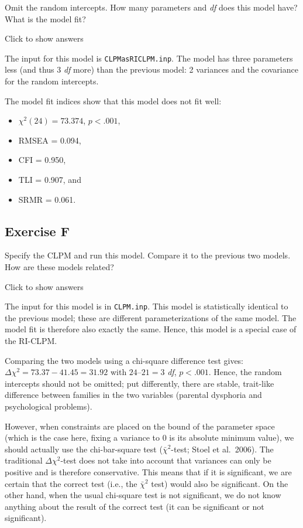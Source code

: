 \documentclass[
]{book}
\providecommand{\tightlist}{%
  \setlength{\itemsep}{0pt}\setlength{\parskip}{0pt}}
\begin{document}
Omit the random intercepts. How many parameters and \emph{df} does this model have? What is the model fit?

Click to show answers

The input for this model is \texttt{CLPMasRICLPM.inp}. The model has three parameters less (and thus 3 \emph{df} more) than the previous model: 2 variances and the covariance for the random intercepts.

The model fit indices show that this model does not fit well:

\begin{itemize}
\tightlist
\item
  \(\chi^{2} (24) = 73.374\), \(p < .001\),
\item
  RMSEA = 0.094,
\item
  CFI = 0.950,
\item
  TLI = 0.907, and
\item
  SRMR = 0.061.
\end{itemize}

\hypertarget{exercise-f-1}{%
\subsection{Exercise F}\label{exercise-f-1}}

Specify the CLPM and run this model. Compare it to the previous two models. How are these models related?

Click to show answers

The input for this model is in \texttt{CLPM.inp}. This model is statistically identical to the previous model; these are different parameterizations of the same model. The model fit is therefore also exactly the same. Hence, this model is a special case of the RI-CLPM.

Comparing the two models using a chi-square difference test gives: \(\Delta \chi^{2} = 73.37 - 41.45 = 31.92\) with \(24 – 21 = 3\) \emph{df}, \(p < .001\). Hence, the random intercepts should not be omitted; put differently, there are stable, trait-like difference between families in the two variables (parental dysphoria and psychological problems).

However, when constraints are placed on the bound of the parameter space (which is the case here, fixing a variance to 0 is its absolute minimum value), we should actually use the chi-bar-square test (\(\bar{\chi}^{2}\)-test; Stoel et al.~2006). The traditional \(\Delta \chi^{2}\)-test does not take into account that variances can only be positive and is therefore conservative. This means that if it is significant, we are certain that the correct test (i.e., the \(\bar{\chi}^{2}\) test) would also be significant. On the other hand, when the usual chi‐square test is not significant, we do not know anything about the result of the correct test (it can be significant or not significant).
\end{document}

